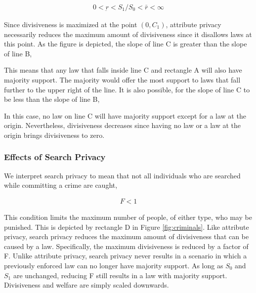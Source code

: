 \begin{align}
0 < \underbar r < S_1 /S_0 < \bar r < \infty
\end{align}

Since divisiveness is maximized at the point $ \left(0, C_1 \right)$, attribute privacy necessarily reduces the maximum amount of divisiveness since it disallows laws at this point.  As the figure is depicted, the slope of line C is greater than the slope of line B,


This means that any law that falls inside line C and rectangle A will also have majority support.  The majority would offer the most support to laws that fall further to the upper right of the line.  It is also possible, for the slope of line C to be less than the slope of line B,
%

In this case, no law on line C will have majority support except for a law at the origin.  Nevertheless, divisiveness decreases since having no law or a law at the origin brings divisiveness to zero.


\subsubsection{Effects of Search Privacy}

We interpret search privacy to mean that not all individuals who are searched while committing a crime are caught, 

\begin{align}
F<1
\end{align}

This condition limits the maximum number of people, of either type, who may be punished.  This is depicted by rectangle D in Figure \ref{fig:criminals}.  Like attribute privacy, search privacy reduces the maximum amount of divisiveness that can be caused by a law.  Specifically, the maximum divisiveness is reduced by a factor of F.  Unlike attribute privacy, search privacy never results in a scenario in which a previously enforced law can no longer have majority support.  As long as $S_0$ and $S_1$ are unchanged, reducing F still results in a law with majority support.  Divisiveness and welfare are simply scaled downwards.

